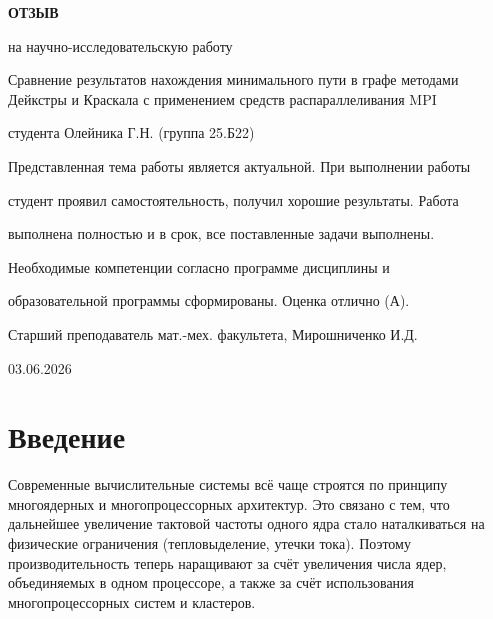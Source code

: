 \documentclass[14pt,a4paper]{article}
\begin{document}
\begin{center}
    
    {\large \bfseries ОТЗЫВ\par}
    
    \vspace{0.3cm}
    
    на научно-исследовательскую работу\par
    
    \vspace{0.1cm}
    
    \guillemetleft Сравнение результатов нахождения минимального пути в графе методами Дейкстры и Краскала с применением средств распараллеливания MPI\guillemetright\par
    
    \vspace{0.1cm}
    
    студента Олейника Г.Н. (группа 25.Б22)\par
    
    \vspace{2cm}

\end{center}


\noindent \hspace{2.4cm} Представленная тема работы является актуальной. При выполнении работы

\noindent \hspace{2.4cm} студент проявил самостоятельность, получил хорошие результаты. Работа

\noindent \hspace{2.4cm} выполнена полностью и в срок, все поставленные задачи выполнены.

\noindent \hspace{2.4cm} Необходимые компетенции согласно программе дисциплины и

\noindent \hspace{2.4cm} образовательной программы сформированы. Оценка отлично (А).

\vspace{1.7cm}

\hspace{-1.55cm}Старший преподаватель мат.-мех. факультета, \hspace{6.5cm} Мирошниченко И.Д.\par
\hspace{-1.55cm}03.06.2026

\newpage
\tableofcontents
\newpage

\section{Введение}
Современные вычислительные системы всё чаще строятся по принципу многоядерных и многопроцессорных архитектур. Это связано с тем, что дальнейшее увеличение тактовой частоты одного ядра стало наталкиваться на физические ограничения (тепловыделение, утечки тока). Поэтому производительность теперь наращивают за счёт увеличения числа ядер, объединяемых в одном процессоре, а также за счёт использования многопроцессорных систем и кластеров.
\end{document}

